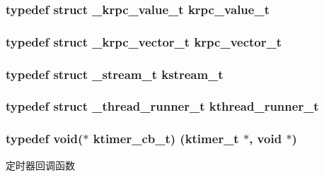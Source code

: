 \subsubsection[{krpc\+\_\+value\+\_\+t}]{\setlength{\rightskip}{0pt plus 5cm}typedef struct {\bf \+\_\+krpc\+\_\+value\+\_\+t} {\bf krpc\+\_\+value\+\_\+t}}\label{a00054_a000feb7ef27197163529c0d6f539340b_a000feb7ef27197163529c0d6f539340b}
\hypertarget{a00054_af9c53e08bd04353abcdf8e0720e4c4c8_af9c53e08bd04353abcdf8e0720e4c4c8}{}
\subsubsection[{krpc\+\_\+vector\+\_\+t}]{\setlength{\rightskip}{0pt plus 5cm}typedef struct {\bf \+\_\+krpc\+\_\+vector\+\_\+t} {\bf krpc\+\_\+vector\+\_\+t}}\label{a00054_af9c53e08bd04353abcdf8e0720e4c4c8_af9c53e08bd04353abcdf8e0720e4c4c8}
\hypertarget{a00054_acc208c4c40c875eebbfef88f00fffacf_acc208c4c40c875eebbfef88f00fffacf}{}
\subsubsection[{kstream\+\_\+t}]{\setlength{\rightskip}{0pt plus 5cm}typedef struct {\bf \+\_\+stream\+\_\+t} {\bf kstream\+\_\+t}}\label{a00054_acc208c4c40c875eebbfef88f00fffacf_acc208c4c40c875eebbfef88f00fffacf}
\hypertarget{a00054_a4f78c259c9527c821f1a6f87495dd339_a4f78c259c9527c821f1a6f87495dd339}{}
\subsubsection[{kthread\+\_\+runner\+\_\+t}]{\setlength{\rightskip}{0pt plus 5cm}typedef struct {\bf \+\_\+thread\+\_\+runner\+\_\+t} {\bf kthread\+\_\+runner\+\_\+t}}\label{a00054_a4f78c259c9527c821f1a6f87495dd339_a4f78c259c9527c821f1a6f87495dd339}
\hypertarget{a00054_a2333fd0f2c3a85faf586300ca40deed4_a2333fd0f2c3a85faf586300ca40deed4}{}
\subsubsection[{ktimer\+\_\+cb\+\_\+t}]{\setlength{\rightskip}{0pt plus 5cm}typedef void($\ast$ ktimer\+\_\+cb\+\_\+t) ({\bf ktimer\+\_\+t} $\ast$, void $\ast$)}\label{a00054_a2333fd0f2c3a85faf586300ca40deed4_a2333fd0f2c3a85faf586300ca40deed4}
定时器回调函数 \hypertarget{a00054_a024af2aa29615e7a811ea6c45438157d_a024af2aa29615e7a811ea6c45438157d}{}
